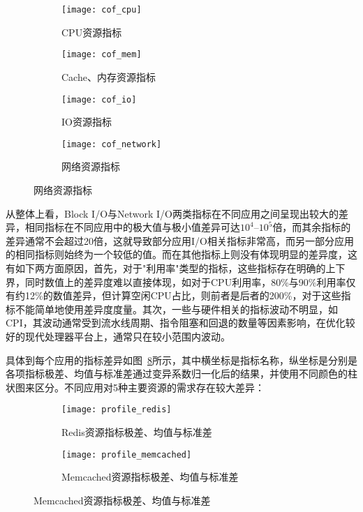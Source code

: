 \begin{figure}[H]
    \centering
    \begin{subfigure}[b]{0.49\textwidth}
      \texttt{[image: cof\_cpu]}
      \caption{CPU资源指标}
      \label{fig:cof_cpu}
    \end{subfigure}
    \begin{subfigure}[b]{0.49\textwidth}
        \texttt{[image: cof\_mem]}
        \caption{Cache、内存资源指标}
        \label{fig:cof_cache_mem}
    \end{subfigure}
    \begin{subfigure}[b]{0.49\textwidth}
        \texttt{[image: cof\_io]}
        \caption{IO资源指标}
        \label{fig:cof_io}
    \end{subfigure}
    \begin{subfigure}[b]{0.49\textwidth}
        \texttt{[image: cof\_network]}
        \caption{网络资源指标}
        \label{fig:cof_network}
    \end{subfigure}
\label{fig:resource_affinity}
\end{figure}

从整体上看，Block I/O与Network I/O两类指标在不同应用之间呈现出较大的差异，相同指标在不同应用中的极大值与极小值差异可达$10^4$--$10^5$倍，而其余指标的差异通常不会超过20倍，这就导致部分应用I/O相关指标非常高，而另一部分应用的相同指标则始终为一个较低的值。而在其他指标上则没有体现明显的差异度，这有如下两方面原因，首先，对于"利用率"类型的指标，这些指标存在明确的上下界，同时数值上的差异度难以直接体现，如对于CPU利用率，80\%与90\%利用率仅有约12\%的数值差异，但计算空闲CPU占比，则前者是后者的200\%，对于这些指标不能简单地使用差异度度量。其次，一些与硬件相关的指标波动不明显，如CPI，其波动通常受到流水线周期、指令阻塞和回退的数量等因素影响，在优化较好的现代处理器平台上，通常只在较小范围内波动。

具体到每个应用的指标差异如图~\ref{fig:resource_affinity_0}所示，其中横坐标是指标名称，纵坐标是分别是各项指标极差、均值与标准差通过变异系数归一化后的结果，并使用不同颜色的柱状图来区分。不同应用对5种主要资源的需求存在较大差异：

\begin{figure}[H]
    \centering
    \begin{subfigure}[b]{0.9\textwidth}
      \texttt{[image: profile\_redis]}
      \caption{Redis资源指标极差、均值与标准差}
      \label{fig:profile_redis}
    \end{subfigure}
    \begin{subfigure}[b]{0.9\textwidth}
        \texttt{[image: profile\_memcached]}
        \caption{Memcached资源指标极差、均值与标准差}
        \label{fig:profile_memcached}
    \end{subfigure}
\label{fig:resource_affinity_0}
\end{figure}

